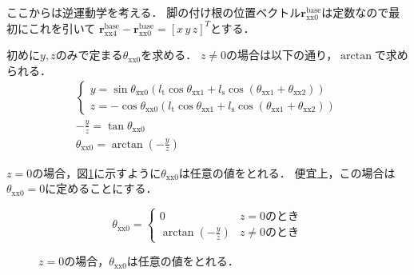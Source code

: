 \documentclass[a4paper]{jlreq}
\begin{document}
  ここからは逆運動学を考える．
  脚の付け根の位置ベクトル$\boldsymbol{r}^\mathrm{base}_\mathrm{xx0}$は定数なので最初にこれを引いて
  $\boldsymbol{r}_\mathrm{xx4}^\mathrm{base} - \boldsymbol{r}^\mathrm{base}_\mathrm{xx0} = [x\, y\, z]^T$とする．

  初めに$y, z$のみで定まる$\theta_\mathrm{xx0}$を求める．
  $z\neq 0$の場合は以下の通り，$\arctan$で求められる．
  \begin{gather*}
    \left\{
    \begin{array}{l}
        y = \sin\theta_\mathrm{xx0}\left(l_\mathrm{t}\cos{\theta_\mathrm{xx1}} + l_\mathrm{s}\cos{\left(\theta_\mathrm{xx1}+\theta_\mathrm{xx2}\right)}\right) \\
        z = -\cos\theta_\mathrm{xx0}\left(l_\mathrm{t}\cos{\theta_\mathrm{xx1}} + l_\mathrm{s}\cos{\left(\theta_\mathrm{xx1}+\theta_\mathrm{xx2}\right)}\right)
      \end{array}
    \right. \\
    -\frac{y}{z} = \tan\theta_\mathrm{xx0} \\
    \theta_\mathrm{xx0} = \arctan{\left(-\frac{y}{z}\right)}
  \end{gather*}

  $z = 0$の場合，図\ref{fig:fig_ik_z0}に示すように$\theta_\mathrm{xx0}$は任意の値をとれる．
  便宜上，この場合は$\theta_\mathrm{xx0}=0$に定めることにする．

  \[
    \theta_\mathrm{xx0} = \begin{cases}
      0 & z = 0\text{のとき} \\
      \arctan{\left(-\frac{y}{z}\right)} & z\neq 0\text{のとき}
    \end{cases}
  \]

  \begin{figure}[htb]
    \centering
    
    \caption{
      $z = 0$の場合，$\theta_\mathrm{xx0}$は任意の値をとれる．
    }
    \label{fig:fig_ik_z0}
  \end{figure}
\end{document}
